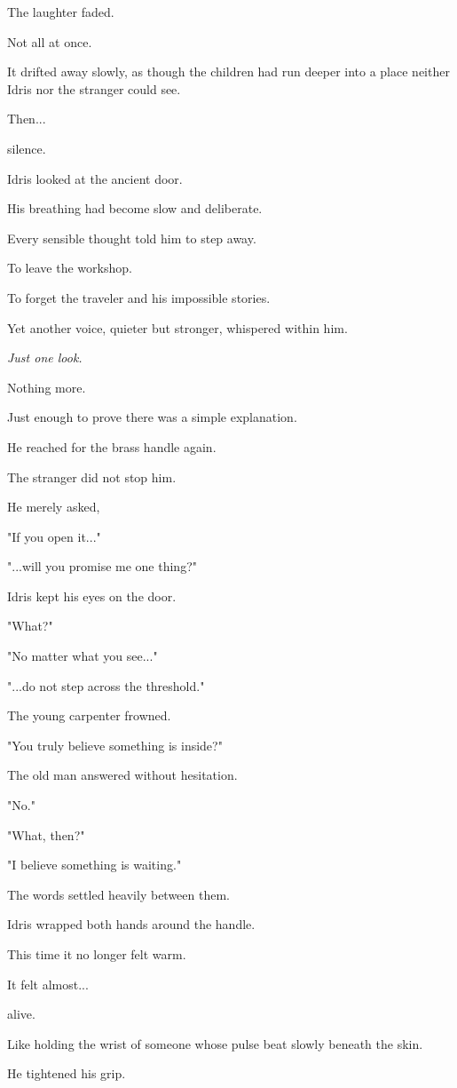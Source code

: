 \documentclass[12pt,openany]{book}
\begin{document}
The laughter faded.

Not all at once.

It drifted away slowly, as though the children had run deeper into a place neither Idris nor the stranger could see.

Then...

silence.

Idris looked at the ancient door.

His breathing had become slow and deliberate.

Every sensible thought told him to step away.

To leave the workshop.

To forget the traveler and his impossible stories.

Yet another voice, quieter but stronger, whispered within him.

\emph{Just one look.}

Nothing more.

Just enough to prove there was a simple explanation.

He reached for the brass handle again.

The stranger did not stop him.

He merely asked,

"If you open it..."

"...will you promise me one thing?"

Idris kept his eyes on the door.

"What?"

"No matter what you see..."

"...do not step across the threshold."

The young carpenter frowned.

"You truly believe something is inside?"

The old man answered without hesitation.

"No."

"What, then?"

"I believe something is waiting."

The words settled heavily between them.

Idris wrapped both hands around the handle.

This time it no longer felt warm.

It felt almost...

alive.

Like holding the wrist of someone whose pulse beat slowly beneath the skin.

He tightened his grip.
\end{document}
